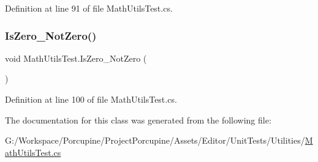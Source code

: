 Definition at line 91 of file Math\+Utils\+Test.\+cs.

\mbox{\label{class_math_utils_test_a23e9b9f59ca752cd49b285b3fdb3b615}} 
\subsubsection{\texorpdfstring{Is\+Zero\+\_\+\+Not\+Zero()}{IsZero\_NotZero()}}
{\footnotesize\ttfamily void Math\+Utils\+Test.\+Is\+Zero\+\_\+\+Not\+Zero (\begin{DoxyParamCaption}{ }\end{DoxyParamCaption})}



Definition at line 100 of file Math\+Utils\+Test.\+cs.



The documentation for this class was generated from the following file\+:\begin{DoxyCompactItemize}
\item 
G\+:/\+Workspace/\+Porcupine/\+Project\+Porcupine/\+Assets/\+Editor/\+Unit\+Tests/\+Utilities/\hyperlink{_math_utils_test_8cs}{Math\+Utils\+Test.\+cs}\end{DoxyCompactItemize}
